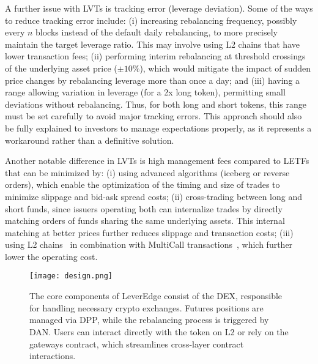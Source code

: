 A further issue with LVTs is tracking error (leverage deviation). Some of the ways to reduce tracking error include: (i) increasing rebalancing frequency, possibly every \(n\) blocks instead of the default daily rebalancing, to more precisely maintain the target leverage ratio. This may involve using L2 chains that have lower transaction fees; (ii) performing interim rebalancing at threshold crossings of the underlying asset price (\eg \(\pm10\%\)), which would mitigate the impact of sudden price changes by rebalancing leverage more than once a day; and (iii) having a range allowing variation in leverage (\eg [1.95x, 2.05x] for a 2x long token), permitting small deviations without rebalancing. Thus, for both long and short tokens, this range must be set carefully to avoid major tracking errors. This approach should also be fully explained to investors to manage expectations properly, as it represents a workaround rather than a definitive solution.

Another notable difference in LVTs is high management fees compared to LETFs that can be minimized by: (i) using advanced algorithms (iceberg or reverse orders), which enable the optimization of the timing and size of trades to minimize slippage and bid-ask spread costs; (ii) cross-trading between long and short funds, since issuers operating both can internalize trades by directly matching orders of funds sharing the same underlying assets. This internal matching at better prices further reduces slippage and transaction costs; (iii) using L2 chains~\cite{Gangwal_2022} in combination with MultiCall transactions~\cite{hughes2021multicall}, which further lower the operating cost.

\begin{figure}[t]
	\centering
	\texttt{[image: design.png]}
	\caption[LeverEdge components: DEX, DPP, DAN, and gateway]{The core components of LeverEdge consist of the DEX, responsible for handling necessary crypto exchanges. Futures positions are managed via DPP, while the rebalancing process is triggered by DAN. Users can interact directly with the token on L2 or rely on the gateways contract, which streamlines cross-layer contract interactions.}
	\label{fig:design}
\end{figure}

